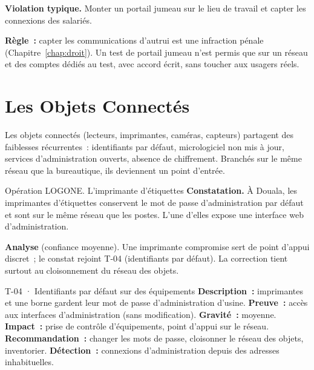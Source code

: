 \begin{boxalert}
\textbf{Violation typique.} Monter un portail jumeau sur le lieu de travail
et capter les connexions des salariés.

\smallskip
\textbf{Règle~:} capter les communications d'autrui est une infraction
pénale (Chapitre~\ref{chap:droit}). Un test de portail jumeau n'est permis
que sur un réseau et des comptes dédiés au test, avec accord écrit, sans
toucher aux usagers réels.
\end{boxalert}

\section{Les Objets Connectés}
\label{sec:c18-objets}

Les objets connectés (lecteurs, imprimantes, caméras, capteurs) partagent
des faiblesses récurrentes~: identifiants par défaut, micrologiciel non mis
à jour, services d'administration ouverts, absence de chiffrement. Branchés
sur le même réseau que la bureautique, ils deviennent un point d'entrée.

\begin{boxscenario}{Opération LOGONE. L'imprimante d'étiquettes}
\textbf{Constatation.} À Douala, les imprimantes d'étiquettes conservent le
mot de passe d'administration par défaut et sont sur le même réseau que les
postes. L'une d'elles expose une interface web d'administration.

\medskip
\textbf{Analyse} (confiance moyenne). Une imprimante compromise sert de
point d'appui discret~; le constat rejoint T-04 (identifiants par défaut).
La correction tient surtout au cloisonnement du réseau des objets.
\end{boxscenario}

\begin{boxobjet}{T-04 · Identifiants par défaut sur des équipements}
\textbf{Description~:} imprimantes et une borne gardent leur mot de passe
d'administration d'usine. \textbf{Preuve~:} accès aux interfaces
d'administration (sans modification). \textbf{Gravité~:} moyenne.
\textbf{Impact~:} prise de contrôle d'équipements, point d'appui sur le
réseau. \textbf{Recommandation~:} changer les mots de passe, cloisonner le
réseau des objets, inventorier. \textbf{Détection~:} connexions
d'administration depuis des adresses inhabituelles.
\end{boxobjet}

